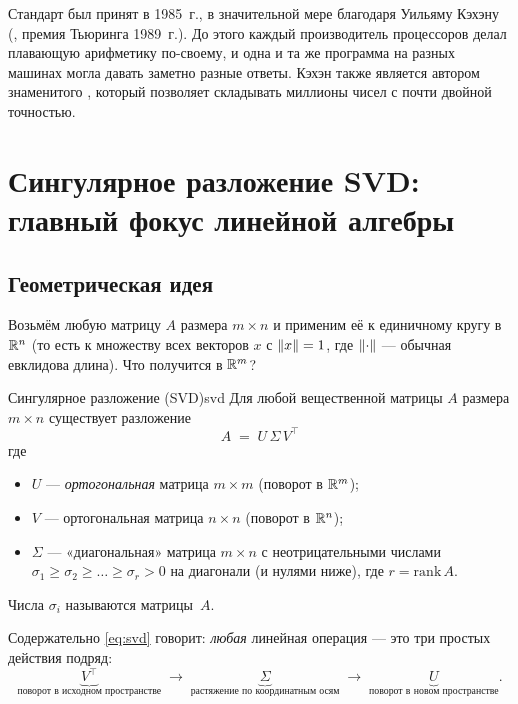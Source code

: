 \begin{historybox}
Стандарт  был принят в 1985~г., в значительной
мере благодаря Уильяму Кэхэну (, премия
Тьюринга 1989~г.). До этого каждый производитель процессоров делал
плавающую арифметику по-своему, и одна и та же программа на разных
машинах могла давать заметно разные ответы. Кэхэн также является
автором знаменитого ,
который позволяет складывать миллионы чисел с почти двойной
точностью.
\end{historybox}

\section{Сингулярное разложение SVD: главный фокус линейной алгебры}
\label{sec:linalg-svd}

\subsection{Геометрическая идея}

Возьмём любую матрицу $A$ размера $m\times n$ и применим её к
единичному кругу в $\mathbb{R}^{n}$ (то есть к множеству всех векторов $x$
с $\left\|x\right\|=1$, где $\left\|\cdot\right\|$ — обычная евклидова длина).
Что получится в $\mathbb{R}^{m}$?

\begin{theorem}{Сингулярное разложение (SVD)}{svd}
Для любой вещественной матрицы $A$ размера $m\times n$ существует
разложение
\begin{equation}\label{eq:svd}
\boxed{\;A \;=\; U\,\Sigma\,V^{\!\top}\;}
\end{equation}
где
\begin{itemize}\itemsep1pt
  \item $U$ — \emph{ортогональная} матрица $m\times m$ (поворот в $\mathbb{R}^{m}$);
  \item $V$ — ортогональная матрица $n\times n$ (поворот в $\mathbb{R}^{n}$);
  \item $\Sigma$ — «диагональная» матрица $m\times n$ с неотрицательными
        числами $\sigma_1\geq \sigma_2\geq\ldots\geq \sigma_r > 0$ на
        диагонали (и нулями ниже), где $r=\mathrm{rank}\,A$.
\end{itemize}
Числа $\sigma_i$ называются  матрицы~$A$.
\end{theorem}

Содержательно \eqref{eq:svd} говорит: \emph{любая} линейная операция —
это три простых действия подряд:
\[
\underbrace{V^{\!\top}}_{\text{поворот в исходном пространстве}}
\;\to\;
\underbrace{\Sigma}_{\text{растяжение по координатным осям}}
\;\to\;
\underbrace{U}_{\text{поворот в новом пространстве}}.
\]

